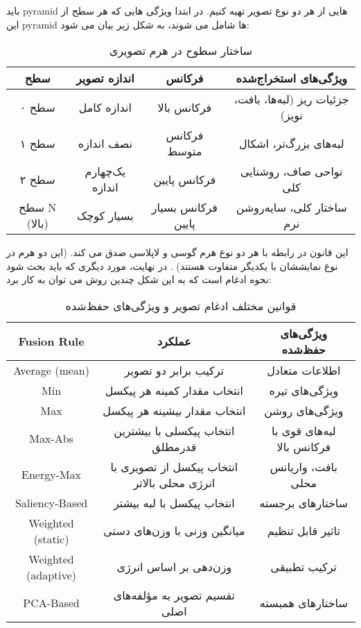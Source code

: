 \documentclass[a4paper,12pt]{article}
\begin{document}
باید pyramid هایی از هر دو نوع تصویر تهیه کنیم. در ابتدا ویژگی هایی که هر سطح از این pyramid ها شامل می شوند، به شکل زیر بیان می شود:
\begin{table}[h]
	\centering
	\begin{tabular}{|c|c|c|c|}
		\hline
		\textbf{سطح} & \textbf{اندازه تصویر} & \textbf{فرکانس} & \textbf{ویژگی‌های استخراج‌شده} \\
		\hline
		سطح ۰ & اندازه کامل & فرکانس بالا & جزئیات ریز (لبه‌ها، بافت، نویز) \\
		\hline
		سطح ۱ & نصف اندازه & فرکانس متوسط & لبه‌های بزرگ‌تر، اشکال \\
		\hline
		سطح ۲ & یک‌چهارم اندازه & فرکانس پایین & نواحی صاف، روشنایی کلی \\
		\hline
		سطح N (بالا) & بسیار کوچک & فرکانس بسیار پایین & ساختار کلی، سایه‌روشن نرم \\
		\hline
	\end{tabular}
	\caption{ساختار سطوح در هرم تصویری}
\end{table}
این قانون در رابطه با هر دو نوع هرم گوسی و لاپلاسی صدق می کند. (این دو هرم در نوع نمایششان با یکدیگر متفاوت هستند) .
در نهایت، مورد دیگری که باید بحث شود نحوه ادغام است که به این شکل چندین روش می توان به کار برد:
\begin{table}[h]
	\centering
	\begin{tabular}{|c|c|c|}
		\hline
		\textbf{Fusion Rule} & \textbf{عملکرد} & \textbf{ویژگی‌های حفظ‌شده} \\
		\hline
		Average (mean) & ترکیب برابر دو تصویر & اطلاعات متعادل \\
		\hline
		Min & انتخاب مقدار کمینه هر پیکسل & ویژگی‌های تیره \\
		\hline
		Max & انتخاب مقدار بیشینه هر پیکسل & ویژگی‌های روشن \\
		\hline
		Max-Abs & انتخاب پیکسلی با بیشترین قدرمطلق & لبه‌های قوی با فرکانس بالا \\
		\hline
		Energy-Max & انتخاب پیکسل از تصویری با انرژی محلی بالاتر & بافت، واریانس محلی \\
		\hline
		Saliency-Based & انتخاب پیکسل با لبه بیشتر & ساختارهای برجسته \\
		\hline
		Weighted (static) & میانگین وزنی با وزن‌های دستی & تاثیر قابل تنظیم \\
		\hline
		Weighted (adaptive) & وزن‌دهی بر اساس انرژی & ترکیب تطبیقی \\
		\hline
		PCA-Based & تقسیم تصویر به مؤلفه‌های اصلی & ساختارهای همبسته \\ 
		\hline
	\end{tabular}
	\caption{قوانین مختلف ادغام تصویر و ویژگی‌های حفظ‌شده}
\end{table}
\end{document}
